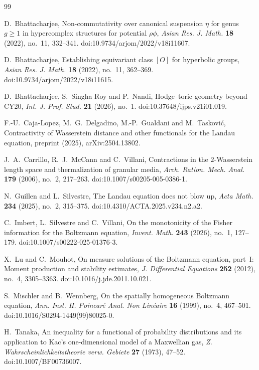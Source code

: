 \documentclass[11pt]{amsart}
\theoremstyle{definition}
\begin{document}
\begin{thebibliography}{99}

 D.~Bhattacharjee, Non-commutativity over canonical suspension $\eta$ for genus $g\ge1$ in hypercomplex structures for potential $\rho\phi$, \emph{Asian Res. J. Math.} \textbf{18} (2022), no.~11, 332--341. doi:10.9734/arjom/2022/v18i11607.

 D.~Bhattacharjee, Establishing equivariant class $[O]$ for hyperbolic groups, \emph{Asian Res. J. Math.} \textbf{18} (2022), no.~11, 362--369. doi:10.9734/arjom/2022/v18i11615.

 D.~Bhattacharjee, S.~Singha Roy and P.~Nandi, Hodge--toric geometry beyond CY20, \emph{Int. J. Prof. Stud.} \textbf{21} (2026), no.~1. doi:10.37648/ijps.v21i01.019.

 F.-U.~Caja-Lopez, M.~G.~Delgadino, M.-P.~Gualdani and M.~Taskovi\'c, Contractivity of Wasserstein distance and other functionals for the Landau equation, preprint (2025), arXiv:2504.13802.

 J.~A.~Carrillo, R.~J.~McCann and C.~Villani, Contractions in the $2$-Wasserstein length space and thermalization of granular media, \emph{Arch. Ration. Mech. Anal.} \textbf{179} (2006), no.~2, 217--263. doi:10.1007/s00205-005-0386-1.

 N.~Guillen and L.~Silvestre, The Landau equation does not blow up, \emph{Acta Math.} \textbf{234} (2025), no.~2, 315--375. doi:10.4310/ACTA.2025.v234.n2.a2.

 C.~Imbert, L.~Silvestre and C.~Villani, On the monotonicity of the Fisher information for the Boltzmann equation, \emph{Invent. Math.} \textbf{243} (2026), no.~1, 127--179. doi:10.1007/s00222-025-01376-3.

 X.~Lu and C.~Mouhot, On measure solutions of the Boltzmann equation, part~I: Moment production and stability estimates, \emph{J. Differential Equations} \textbf{252} (2012), no.~4, 3305--3363. doi:10.1016/j.jde.2011.10.021.

 S.~Mischler and B.~Wennberg, On the spatially homogeneous Boltzmann equation, \emph{Ann. Inst. H. Poincar\'e Anal. Non Lin\'eaire} \textbf{16} (1999), no.~4, 467--501. doi:10.1016/S0294-1449(99)80025-0.

 H.~Tanaka, An inequality for a functional of probability distributions and its application to Kac's one-dimensional model of a Maxwellian gas, \emph{Z. Wahrscheinlichkeitstheorie verw. Gebiete} \textbf{27} (1973), 47--52. doi:10.1007/BF00736007.


\end{thebibliography}
\end{document}
